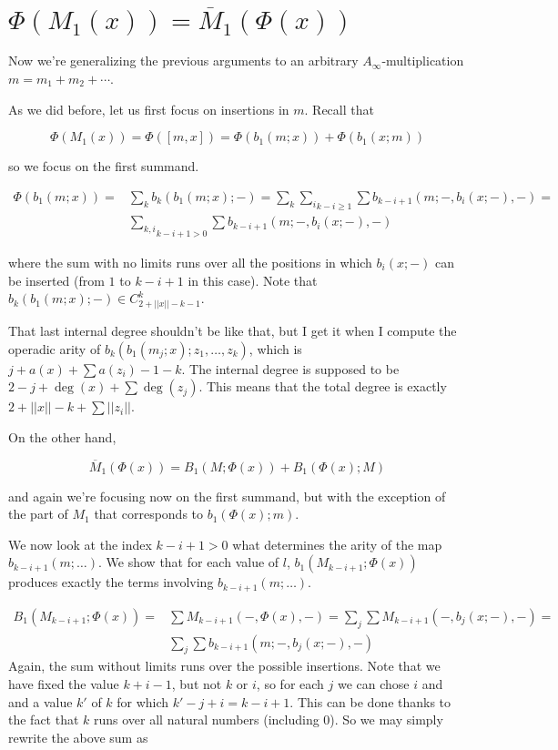 \documentclass[twoside]{article}
\begin{document}

\section{$\Phi(M_1(x))=\overline{M}_1(\Phi(x))$}
Now we're generalizing the previous arguments to an arbitrary $A_\infty$-multiplication $m=m_1+m_2+\cdots$.

As we did before, let us first focus on insertions in $m$. Recall that 

$$\Phi(M_1(x))=\Phi([m,x])=\Phi(b_1(m;x))+\Phi(b_1(x;m))$$

so we focus on the first summand. 

\begin{align*}
\Phi(b_1(m;x))=&\sum_k b_k(b_1(m;x);-)=\sum_k \underset{k-i\geq 1}{\sum_i} \sum b_{k-i+1}(m;-, b_i(x;-),-)=\\
&\underset{k-i+1> 0}{\sum_{k,i}}\sum b_{k-i+1}(m;-, b_i(x;-),-)
\end{align*}

where the sum with no limits runs over all the positions in which $b_i(x;-)$ can be inserted (from $1$ to $k-i+1$ in this case). Note that $b_k(b_1(m;x);-)\in C^k_{2+||x||-k-1}$. 

\begin{remark}
That last internal degree shouldn't be like that, but I get it when I compute the operadic arity of $b_k(b_1(m_j;x);z_1,\dots,z_k)$, which is $j+a(x)+\sum a(z_i)-1-k$. The internal degree is supposed to be $2-j+\deg(x)+\sum \deg(z_j)$. This means that the total degree is exactly $2+||x||-k+\sum ||z_i||$.
\end{remark}

On the other hand, 

$$\overline{M}_1(\Phi(x))=B_1(M;\Phi(x))+B_1(\Phi(x);M)$$

and again we're focusing now on the first summand, but with the exception of the part of $M_1$ that corresponds to $b_1(\Phi(x);m)$. 

We now look at the index $k-i+1> 0$ what determines the arity of the map $b_{k-i+1}(m;\dots)$. We show that for each value of $l$, $b_1(M_{k-i+1};\Phi(x))$ produces exactly the terms involving $b_{k-i+1}(m;\dots)$. 

\begin{align*}
B_1(M_{k-i+1};\Phi(x))=&\sum M_{k-i+1}(-,\Phi(x),-)=\sum_j\sum M_{k-i+1}(-,b_j(x;-),-)=\\
&\sum_j\sum b_{k-i+1}(m;-,b_j(x;-),-)
\end{align*}
Again, the sum without limits runs over the possible insertions. Note that we have fixed the value $k+i-1$, but not $k$ or $i$, so for each $j$ we can chose $i$ and and a value $k'$ of $k$ for which $k'-j+i=k-i+1$. This can be done thanks to the fact that $k$ runs over all natural numbers (including 0). So we may simply rewrite the above sum as
\end{document}
